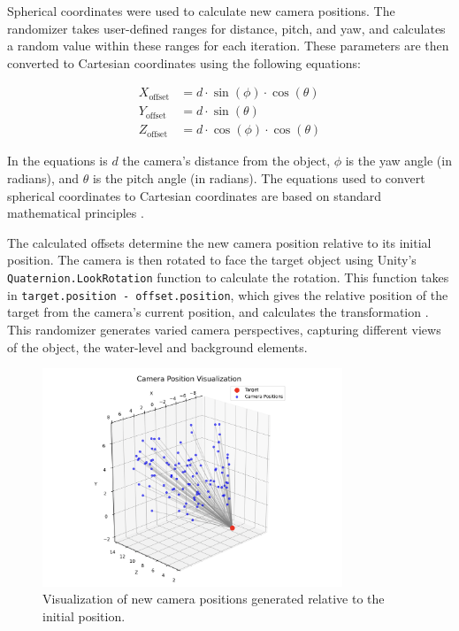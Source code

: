 Spherical coordinates were used to calculate new camera positions. The randomizer takes user-defined ranges for distance, pitch, and yaw, and calculates a random value within these ranges for each iteration. These parameters are then converted to Cartesian coordinates using the following equations:

\begin{align}
X_{\text{offset}} &= d \cdot \sin(\phi) \cdot \cos(\theta) \\
Y_{\text{offset}} &= d \cdot \sin(\theta) \\
Z_{\text{offset}} &= d \cdot \cos(\phi) \cdot \cos(\theta)
\end{align}

\noindent In the equations is \(d\) the camera's distance from the object, \(\phi\) is the yaw angle (in radians), and \(\theta\) is the pitch angle (in radians). The equations used to convert spherical coordinates to Cartesian coordinates are based on standard mathematical principles \cite{wolfram_spherical_coordinates}.

The calculated offsets determine the new camera position relative to its initial position. The camera is then rotated to face the target object using Unity's \texttt{Quaternion.LookRotation} function to calculate the rotation. This function takes in \texttt{target.position - offset.position}, which gives the relative position of the target from the camera's current position, and calculates the transformation \cite{unity_quaternion_lookrotation}. This randomizer generates varied camera perspectives, capturing different views of the object, the water-level and background elements.

\begin{figure}[H]
    \centering
    \includegraphics[width=0.8\textwidth]{Figures/camerapos.png}
    \caption{Visualization of new camera positions generated relative to the initial position.}
    \label{fig:camera_randomizer_plot}
    
\end{figure}

